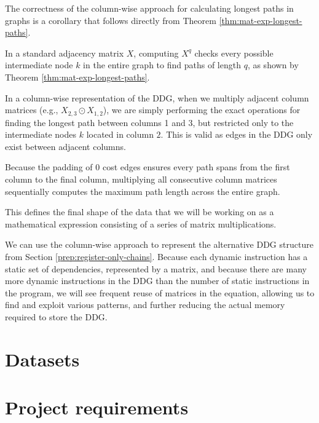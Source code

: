 The correctness of the column-wise approach for calculating longest paths in graphs is a corollary that follows directly 
from Theorem \ref{thm:mat-exp-longest-paths}.

\begin{corollary}
  In a standard adjacency matrix $X$, computing $X^{q}$ checks every possible intermediate node 
  $k$ in the entire graph to find paths of length $q$, as shown by Theorem \ref{thm:mat-exp-longest-paths}.

  In a column-wise representation of the DDG, when we multiply adjacent column matrices (e.g., $X_{2,3} \odot X_{1,2}$),
  we are simply performing the exact operations for finding the longest path between columns 1 and 3,
  but restricted only to the intermediate nodes $k$ located in column $2$.
  This is valid as edges in the DDG only exist between adjacent columns.

  Because the padding of 0 cost edges ensures every path spans from the first column to the final column, multiplying 
  all consecutive column matrices sequentially computes the maximum path length across the entire graph.
\end{corollary}

This defines the final shape of the data that we will be working on as a mathematical expression consisting of a
series of matrix multiplications. 

We can use the column-wise approach to represent the alternative DDG structure from Section \ref{prep:register-only-chains}.
Because each dynamic instruction has a static set of dependencies, represented by a matrix, and because there are many 
more dynamic instructions in the DDG than the number of static instructions in the program, we will see frequent reuse 
of matrices in the equation, allowing us to find and exploit various patterns, and further reducing the actual memory 
required to store the DDG.

\section{Datasets}

\section{Project requirements}
